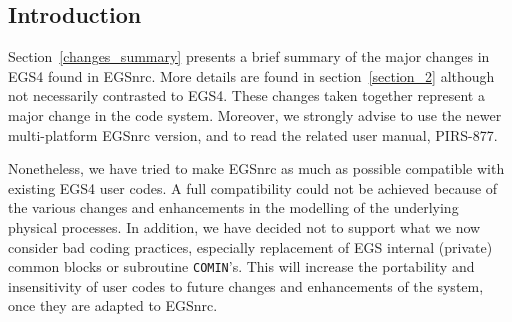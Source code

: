 
%
%
%
%
%
%
%
%
%




\subsection{Introduction}

Section~\ref{changes_summary} presents a brief summary of the major changes
in EGS4 found in EGSnrc. More details are found in section~\ref{section_2}
although not necessarily contrasted to EGS4.  These changes taken together
represent a major change in the code system. Moreover, we strongly
advise to use the newer multi-platform EGSnrc version, and to read the
related user manual, PIRS-877.

Nonetheless, we have tried to make EGSnrc as much as possible compatible
with existing EGS4 user codes. A full compatibility
could not be achieved because of the various
changes and enhancements in the modelling of the
underlying physical processes. In addition, we have
decided not to support what we now consider bad coding practices,
especially
replacement of EGS internal (private) common blocks or
subroutine {\tt COMIN}'s.
This will increase the portability and insensitivity
of user codes to future changes and enhancements of
the system, once they are adapted to EGSnrc.

